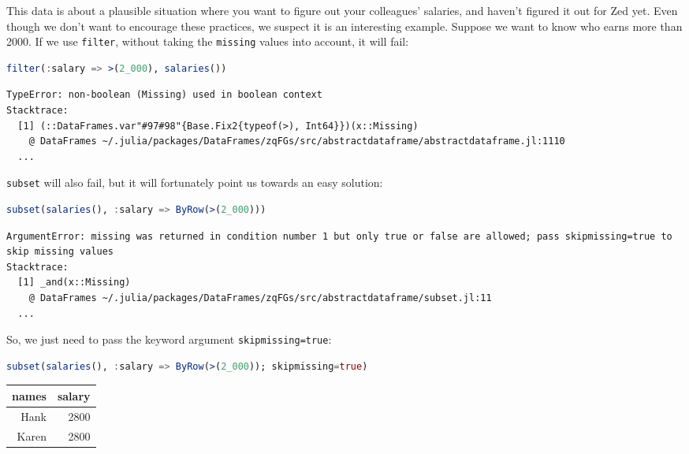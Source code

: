 \documentclass[
  notoc %
]{tufte-book}
\newcommand{\passthrough}[1]{#1}
\begin{document}
This data is about a plausible situation where you want to figure out
your colleagues' salaries, and haven't figured it out for Zed yet. Even
though we don't want to encourage these practices, we suspect it is an
interesting example. Suppose we want to know who earns more than 2000.
If we use \passthrough{\lstinline!filter!}, without taking the
\passthrough{\lstinline!missing!} values into account, it will fail:

\begin{lstlisting}[language=Julia]
filter(:salary => >(2_000), salaries())
\end{lstlisting}

\begin{lstlisting}[language=Output]
TypeError: non-boolean (Missing) used in boolean context
Stacktrace:
  [1] (::DataFrames.var"#97#98"{Base.Fix2{typeof(>), Int64}})(x::Missing)
    @ DataFrames ~/.julia/packages/DataFrames/zqFGs/src/abstractdataframe/abstractdataframe.jl:1110
  ...
\end{lstlisting}

\passthrough{\lstinline!subset!} will also fail, but it will fortunately
point us towards an easy solution:

\begin{lstlisting}[language=Julia]
subset(salaries(), :salary => ByRow(>(2_000)))
\end{lstlisting}

\begin{lstlisting}[language=Output]
ArgumentError: missing was returned in condition number 1 but only true or false are allowed; pass skipmissing=true to skip missing values
Stacktrace:
  [1] _and(x::Missing)
    @ DataFrames ~/.julia/packages/DataFrames/zqFGs/src/abstractdataframe/subset.jl:11
  ...
\end{lstlisting}

So, we just need to pass the keyword argument
\passthrough{\lstinline!skipmissing=true!}:

\begin{lstlisting}[language=Julia]
subset(salaries(), :salary => ByRow(>(2_000)); skipmissing=true)
\end{lstlisting}

\begin{longtable}[]{@{}rr@{}}
\toprule
names & salary \\
\midrule
\endhead
Hank & 2800 \\
Karen & 2800 \\
\bottomrule
\end{longtable}
\end{document}
